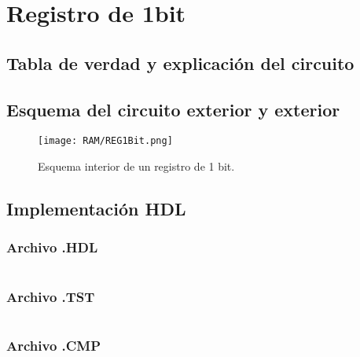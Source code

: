 \documentclass[12pt]{article}
\begin{document}
\section{Registro de 1bit}
	\subsection{Tabla de verdad y explicación del circuito}

	\subsection{Esquema del circuito exterior y exterior}
		\begin{figure}[H]
			\centering
			\texttt{[image: RAM/REG1Bit.png]}
			\caption{Esquema interior de un registro de 1 bit.}
			\label{fig:reg1bit}
		\end{figure}
	\subsection{Implementación HDL}

		\subsubsection{Archivo .HDL}
			\begin{lstlisting}

			\end{lstlisting}
		\subsubsection{Archivo .TST}
			\begin{lstlisting}

			\end{lstlisting}
		\subsubsection{Archivo .CMP}
			\begin{lstlisting}

			\end{lstlisting}
\newpage

\printbibliography[heading=bibintoc]
\end{document}
